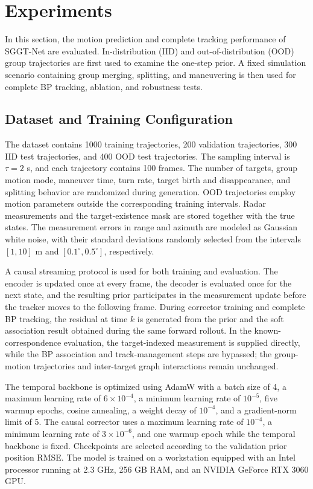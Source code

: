 \documentclass[10pt,doublecolumn]{IEEEtaes}
\begin{document}
\section{Experiments}

In this section, the motion prediction and complete tracking performance of SGGT-Net are evaluated. In-distribution (IID) and out-of-distribution (OOD) group trajectories are first used to examine the one-step prior. A fixed simulation scenario containing group merging, splitting, and maneuvering is then used for complete BP tracking, ablation, and robustness tests.

\subsection{Dataset and Training Configuration}\label{sec:dataset}

The dataset contains 1000 training trajectories, 200 validation trajectories, 300 IID test trajectories, and 400 OOD test trajectories. The sampling interval is $\tau=2$ s, and each trajectory contains 100 frames. The number of targets, group motion mode, maneuver time, turn rate, target birth and disappearance, and splitting behavior are randomized during generation. OOD trajectories employ motion parameters outside the corresponding training intervals. Radar measurements and the target-existence mask are stored together with the true states. The measurement errors in range and azimuth are modeled as Gaussian white noise, with their standard deviations randomly selected from the intervals \([1,10]\) m and \([0.1^\circ,0.5^\circ]\), respectively.


A causal streaming protocol is used for both training and evaluation. The encoder is updated once at every frame, the decoder is evaluated once for the next state, and the resulting prior participates in the measurement update before the tracker moves to the following frame. During corrector training and complete BP tracking, the residual at time $k$ is generated from the prior and the soft association result obtained during the same forward rollout. In the known-correspondence evaluation, the target-indexed measurement is supplied directly, while the BP association and track-management steps are bypassed; the group-motion trajectories and inter-target graph interactions remain unchanged.

The temporal backbone is optimized using AdamW with a batch size of 4, a maximum learning rate of $6\times10^{-4}$, a minimum learning rate of $10^{-5}$, five warmup epochs, cosine annealing, a weight decay of $10^{-4}$, and a gradient-norm limit of 5. The causal corrector uses a maximum learning rate of $10^{-4}$, a minimum learning rate of $3\times10^{-6}$, and one warmup epoch while the temporal backbone is fixed. Checkpoints are selected according to the validation prior position RMSE. The model is trained on a workstation equipped with an Intel processor running at 2.3 GHz, 256 GB RAM, and an NVIDIA GeForce RTX 3060 GPU.
\end{document}
